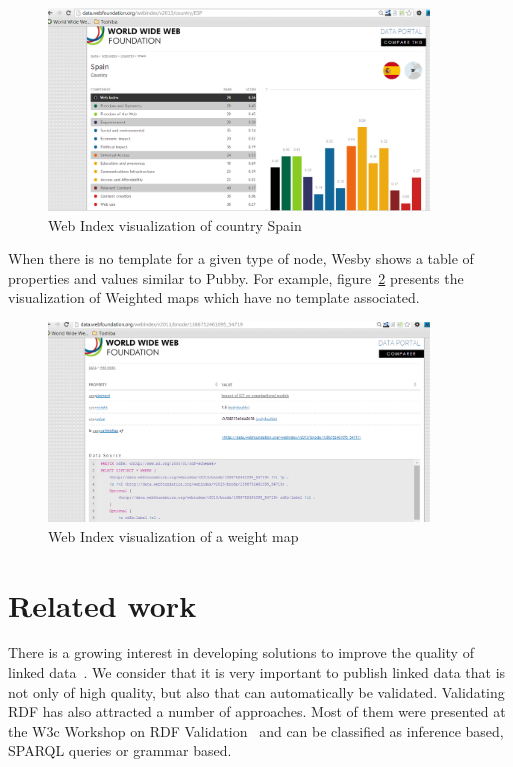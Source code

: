 \documentclass{llncs}
\begin{document}
\begin{figure}[h]
\begin{center}
  \includegraphics[width=0.9\textwidth]{WebIndexSpain}
\end{center}
\caption{Web Index visualization of country Spain}
\label{Fig:WebIndexSpain}
\end{figure}

When there is no template for a given type of node, Wesby shows a table of properties and values similar to Pubby. For example, figure~\ref{Fig:WebIndexWeightMap}
presents the visualization of Weighted maps which have no
template associated.

\begin{figure}[h]
\begin{center}
  \includegraphics[width=0.9\textwidth]{WebIndexWeightMap}
\end{center}
\caption{Web Index visualization of a weight map}
\label{Fig:WebIndexWeightMap}
\end{figure}
  
\section{Related work}

There is a growing interest in developing solutions to improve the quality of linked data~\cite{hogan10,Mendes12,kontokostasDatabugger}. 
We consider that it is very important to publish linked data that is not only of high
 quality, but also that can automatically be validated. 
 Validating RDF has also attracted a number of approaches. 
 Most of them were presented at the W3c Workshop on RDF Validation~\cite{RDFValidation} and can
be classified as inference based, SPARQL queries or grammar based.
\end{document}
